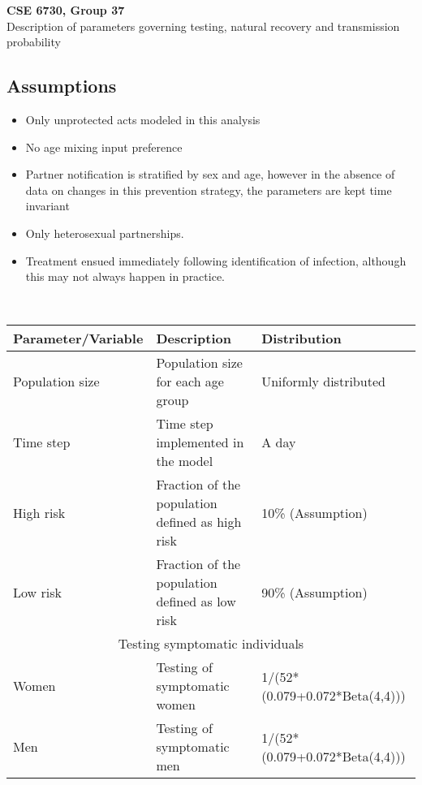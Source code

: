 \documentclass{article}
\begin{document}
	\begin{center}
    
		\LARGE{\textbf{CSE 6730, Group 37}} \\
        \vspace{1em}
        \Large{Description of parameters governing testing, natural recovery and transmission probability} \\
     
	\end{center}
    \begin{normalsize}
    

   	
   	\section{Assumptions}
   	\begin{itemize}
   	    \item Only unprotected acts modeled in this analysis
   	    \item No age mixing input preference
   	    \item Partner notification is stratified by sex and age, however in the absence of data on changes in this prevention strategy, the parameters are kept time invariant
   	    \item Only heterosexual partnerships.
   	    \item Treatment ensued immediately following identification of infection, although this may not always happen in practice.
   	\end{itemize}\\
    

	
	\begin{table}[H]
	\centering
    	\begin{tabular}{ |p{5cm}|p{7cm}|p{5cm}| } 
    		\hline
    		Parameter/Variable & Description & Distribution  \\ 
    		\hline
    		Population size & Population size for each age group & Uniformly distributed\\
    		Time step &	Time step implemented in the model & 	A day \\
			High risk & Fraction of the population defined as high risk	& 10\% (Assumption) \\
			Low risk & Fraction of the population defined as low risk & 90\% (Assumption)\\
			\hline
			\multicolumn{3}{|c|}{Testing symptomatic individuals} \\
			\hline
			Women &	Testing of symptomatic  women	& 1/(52*(0.079+0.072*Beta(4,4)))\\
			Men	& Testing of symptomatic men	& 1/(52*(0.079+0.072*Beta(4,4)))\\
			\hline
			

\end{tabular}
\end{table}
\end{normalsize}
\end{document}
